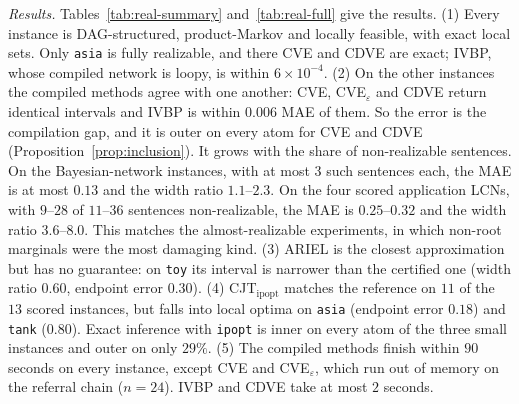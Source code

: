 \documentclass{article} %
\newenvironment{revblock}{\color{blue}}{}
\begin{document}
\begin{revblock}
\emph{Results.} Tables~\ref{tab:real-summary} and~\ref{tab:real-full} give the results. (1) Every instance is DAG-structured, product-Markov and locally feasible, with exact local sets. Only \texttt{asia} is fully realizable, and there CVE and CDVE are exact; IVBP, whose compiled network is loopy, is within $6\times10^{-4}$. (2) On the other instances the compiled methods agree with one another: CVE, CVE$_\varepsilon$ and CDVE return identical intervals and IVBP is within $0.006$ MAE of them. So the error is the compilation gap, and it is outer on every atom for CVE and CDVE (Proposition~\ref{prop:inclusion}). It grows with the share of non-realizable sentences. On the Bayesian-network instances, with at most $3$ such sentences each, the MAE is at most $0.13$ and the width ratio $1.1$--$2.3$. On the four scored application LCNs, with $9$--$28$ of $11$--$36$ sentences non-realizable, the MAE is $0.25$--$0.32$ and the width ratio $3.6$--$8.0$. This matches the almost-realizable experiments, in which non-root marginals were the most damaging kind. (3) ARIEL is the closest approximation but has no guarantee: on \texttt{toy} its interval is narrower than the certified one (width ratio $0.60$, endpoint error $0.30$). (4) CJT$_{\text{ipopt}}$ matches the reference on $11$ of the $13$ scored instances, but falls into local optima on \texttt{asia} (endpoint error $0.18$) and \texttt{tank} ($0.80$). Exact inference with \texttt{ipopt} is inner on every atom of the three small instances and outer on only $29\%$. (5) The compiled methods finish within $90$ seconds on every instance, except CVE and CVE$_\varepsilon$, which run out of memory on the referral chain ($n=24$). IVBP and CDVE take at most $2$ seconds.



\end{revblock}


\end{document}
